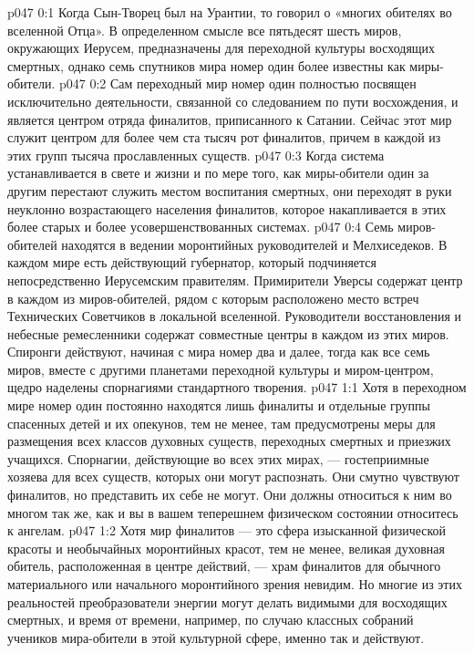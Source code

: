 \vs p047 0:1 Когда Сын\hyp{}Творец был на Урантии, то говорил о «многих обителях во вселенной Отца». В определенном смысле все пятьдесят шесть миров, окружающих Иерусем, предназначены для переходной культуры восходящих смертных, однако семь спутников мира номер один более известны как миры\hyp{}обители.
\vs p047 0:2 Сам переходный мир номер один полностью посвящен исключительно деятельности, связанной со следованием по пути восхождения, и является центром отряда финалитов, приписанного к Сатании. Сейчас этот мир служит центром для более чем ста тысяч рот финалитов, причем в каждой из этих групп тысяча прославленных существ.
\vs p047 0:3 Когда система устанавливается в свете и жизни и по мере того, как миры\hyp{}обители один за другим перестают служить местом воспитания смертных, они переходят в руки неуклонно возрастающего населения финалитов, которое накапливается в этих более старых и более усовершенствованных системах.
\vs p047 0:4 Семь миров\hyp{}обителей находятся в ведении моронтийных руководителей и Мелхиседеков. В каждом мире есть действующий губернатор, который подчиняется непосредственно Иерусемским правителям. Примирители Уверсы содержат центр в каждом из миров\hyp{}обителей, рядом с которым расположено место встреч Технических Советчиков в локальной вселенной. Руководители восстановления и небесные ремесленники содержат совместные центры в каждом из этих миров. Спиронги действуют, начиная с мира номер два и далее, тогда как все семь миров, вместе с другими планетами переходной культуры и миром\hyp{}центром, щедро наделены спорнагиями стандартного творения.
\vs p047 1:1 Хотя в переходном мире номер один постоянно находятся лишь финалиты и отдельные группы спасенных детей и их опекунов, тем не менее, там предусмотрены меры для размещения всех классов духовных существ, переходных смертных и приезжих учащихся. Спорнагии, действующие во всех этих мирах, --- гостеприимные хозяева для всех существ, которых они могут распознать. Они смутно чувствуют финалитов, но представить их себе не могут. Они должны относиться к ним во многом так же, как и вы в вашем теперешнем физическом состоянии относитесь к ангелам.
\vs p047 1:2 Хотя мир финалитов --- это сфера изысканной физической красоты и необычайных моронтийных красот, тем не менее, великая духовная обитель, расположенная в центре действий, --- храм финалитов для обычного материального или начального моронтийного зрения невидим. Но многие из этих реальностей преобразователи энергии могут делать видимыми для восходящих смертных, и время от времени, например, по случаю классных собраний учеников мира\hyp{}обители в этой культурной сфере, именно так и действуют.
